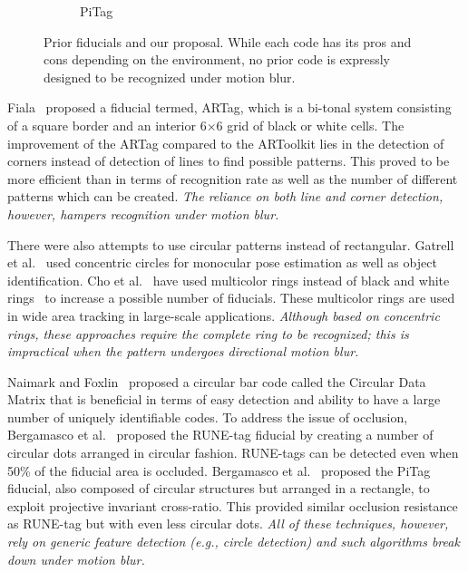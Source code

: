 \begin{figure}[b!]
\begin{subfigure}[b]{0.2\linewidth}
  PiTag\quad~\cite{Pitag13}
 \end{subfigure}
 \caption[Prior fiducials]{Prior fiducials and our proposal. 
 While each code has its pros and cons depending on the environment, no
 prior code is expressly designed to be recognized under motion blur.}
 \label{fig:previous_work}
\end{figure}


Fiala~\cite{Fiala05} proposed a fiducial termed, ARTag, which is a
bi-tonal system consisting of a square border and an interior
6$\times$6 grid of black or white cells. The improvement of the ARTag
compared to the ARToolkit lies in the detection of corners instead of
detection of lines to find possible patterns.  This proved to be more
efficient than \cite{ARToolkit02} in terms of recognition rate as well
as the number of different patterns which can be created.  {\it The
reliance on both line and corner detection, however, hampers
recognition under motion blur.}

There were also attempts to use circular patterns instead of
rectangular.  Gatrell et al.~\cite{concentric} used concentric circles
for monocular pose estimation as well as object identification. Cho et
al.~\cite{Cho:2001,Cho97fastcolor} have used multicolor rings instead
of black and white rings~\cite{concentric} to increase a possible number
of fiducials.  These multicolor rings are used in wide area tracking
in large-scale applications.  {\it Although based on  concentric rings, these
approaches require the complete ring to be recognized; this is
impractical when the pattern undergoes directional motion blur.}

Naimark and Foxlin~\cite{NaimarkF02} proposed a circular bar code
called the Circular Data Matrix that is beneficial in terms of easy
detection and ability to have a large number of uniquely identifiable
codes.  To address the issue of occlusion, Bergamasco et
al.~\cite{runetag11} proposed the RUNE-tag fiducial by creating a
number of circular dots arranged in circular fashion. RUNE-tags can be
detected even when 50\% of the fiducial area is occluded. Bergamasco
et al.~\cite{Pitag13} proposed the PiTag fiducial, also composed of
circular structures but arranged in a rectangle, to exploit projective
invariant cross-ratio.  This provided similar occlusion resistance as
RUNE-tag but with even less circular dots. {\it All of these techniques,
however, rely on generic feature detection (e.g., circle detection)
and such algorithms break down under motion blur.}\\

